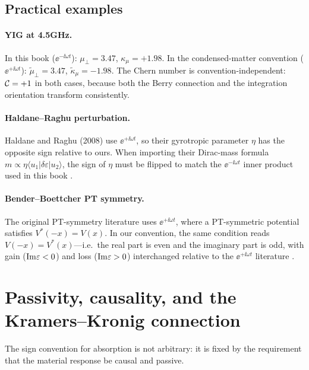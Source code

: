 \subsection{Practical examples}
\label{sec:appD-translation-examples}

\paragraph{YIG at 4.5\;GHz.}
In this book ($\ee^{-\ii\omega t}$): $\mu_\perp=3.47$,
$\kappa_\mu=+1.98$.  In the condensed-matter convention
($\ee^{+\ii\omega t}$): $\tilde{\mu}_\perp=3.47$,
$\tilde{\kappa}_\mu=-1.98$.  The Chern number is convention-independent:
$\mathcal{C}=+1$ in both cases, because both the Berry connection and the
integration orientation transform consistently.

\paragraph{Haldane--Raghu perturbation.}
Haldane and Raghu (2008) use $\ee^{+\ii\omega t}$, so their
gyrotropic parameter $\eta$ has the opposite sign relative to ours.
When importing their Dirac-mass formula
$m\propto\eta\langle u_1|\delta\varepsilon|u_2\rangle$, the sign of
$\eta$ must be flipped to match the $\ee^{-\ii\omega t}$ inner
product used in this book \cite{haldane2008possible,gangaraj2016berry}.

\paragraph{Bender--Boettcher PT symmetry.}
The original PT-symmetry literature uses $\ee^{+\ii\omega t}$, where
a PT-symmetric potential satisfies $V^*(-x)=V(x)$.  In our convention,
the same condition reads $V(-x)=V^*(x)$---i.e.\ the real part is even
and the imaginary part is odd, with gain ($\mathrm{Im}\varepsilon<0$)
and loss ($\mathrm{Im}\varepsilon>0$) interchanged relative to the
$\ee^{+\ii\omega t}$ literature \cite{bender1998real,guo2009observation}.

\section{Passivity, causality, and the Kramers--Kronig connection}
\label{sec:appD-passivity-causality}

The sign convention for absorption is not arbitrary: it is fixed by
the requirement that the material response be causal and passive.

